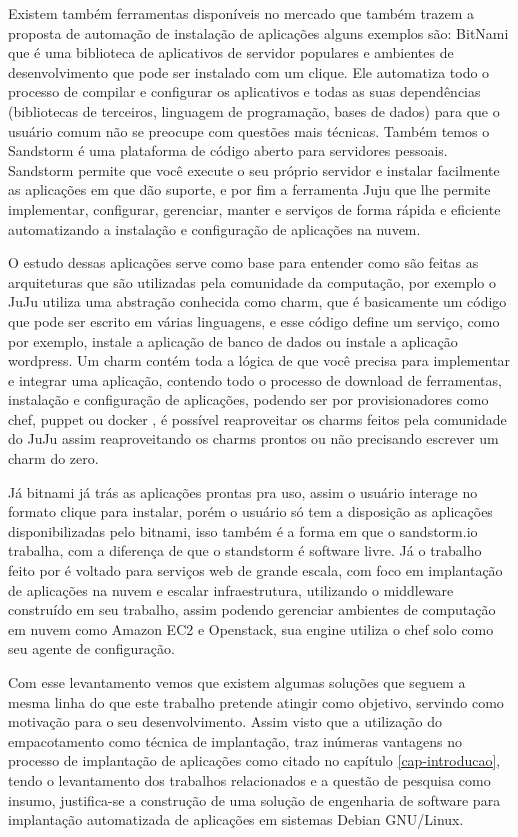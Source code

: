 Existem também ferramentas disponíveis no mercado que também trazem a proposta
de automação de instalação de aplicações alguns exemplos são: \cite{bitnami}
BitNami que é uma biblioteca de aplicativos de servidor populares e ambientes de
desenvolvimento que pode ser instalado com um clique. Ele automatiza todo o
processo de compilar e configurar os aplicativos e todas as suas dependências
(bibliotecas de terceiros, linguagem de programação, bases de dados) para que o
usuário comum não se preocupe com questões mais técnicas. Também temos o \cite{sandstormio}
Sandstorm é uma plataforma de código aberto para servidores
pessoais. Sandstorm permite que você execute o seu próprio servidor e instalar
facilmente as aplicações em que dão suporte, e por fim a ferramenta \cite{juju}
Juju que lhe permite implementar, configurar, gerenciar, manter e serviços de forma
rápida e eficiente automatizando a instalação e configuração de aplicações na nuvem.

O estudo dessas aplicações serve como base para entender como são feitas as
arquiteturas que são utilizadas pela comunidade da computação, por exemplo o JuJu
utiliza uma abstração conhecida como charm, que é basicamente um código que pode ser
escrito em várias linguagens, e esse código define um serviço, como por exemplo,
instale a aplicação de banco de dados ou instale a aplicação wordpress. Um charm
contém toda a lógica de que você precisa para implementar e integrar uma aplicação,
contendo todo o processo de download de ferramentas, instalação e configuração de
aplicações, podendo ser por provisionadores como chef, puppet ou docker \cite{juju},
é possível reaproveitar os charms feitos pela comunidade do JuJu assim
reaproveitando os charms prontos ou não precisando escrever um charm do zero.

Já bitnami já trás as aplicações
prontas pra uso, assim o usuário interage no formato clique para instalar, porém
o usuário só tem a disposição as aplicações disponibilizadas pelo bitnami, isso
também é a forma em que o sandstorm.io trabalha, com a diferença de que o standstorm é
software livre. Já o trabalho feito por \cite{leo2014} é voltado para serviços web
de grande escala, com foco em implantação de aplicações na nuvem e escalar infraestrutura, utilizando o middleware
construído em seu trabalho, assim podendo gerenciar ambientes de computação em nuvem
como Amazon EC2 e Openstack, sua engine utiliza o chef solo como seu agente de configuração.

Com esse levantamento vemos que existem algumas soluções que seguem a mesma
linha do que este trabalho pretende atingir como objetivo, servindo como motivação
para o seu desenvolvimento. Assim visto que a utilização do empacotamento
como técnica de implantação, traz inúmeras vantagens no processo de implantação
de aplicações como citado no capítulo \ref{cap-introducao}, tendo o levantamento
dos trabalhos relacionados e a questão de pesquisa como insumo, justifica-se a
construção de uma solução de engenharia de software para implantação automatizada
de aplicações em sistemas Debian GNU/Linux.

